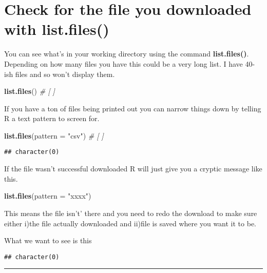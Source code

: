 \documentclass[]{book}
\newenvironment{Shaded}{\begin{snugshade}}{\end{snugshade}}
\newcommand{\KeywordTok}[1]{\textcolor[rgb]{0.13,0.29,0.53}{\textbf{#1}}}
\newcommand{\DataTypeTok}[1]{\textcolor[rgb]{0.13,0.29,0.53}{#1}}
\newcommand{\StringTok}[1]{\textcolor[rgb]{0.31,0.60,0.02}{#1}}
\newcommand{\CommentTok}[1]{\textcolor[rgb]{0.56,0.35,0.01}{\textit{#1}}}
\newcommand{\NormalTok}[1]{#1}
\theoremstyle{definition}
\theoremstyle{definition}
\theoremstyle{definition}
\theoremstyle{remark}
\begin{document}
\section{Check for the file you downloaded with
list.files()}\label{check-for-the-file-you-downloaded-with-list.files}

You can see what's in your working directory using the command
\textbf{list.files()}. Depending on how many files you have this could
be a very long list. I have 40-ish files and so won't display them.

\begin{Shaded}
\begin{Highlighting}[]
\KeywordTok{list.files}\NormalTok{() }\CommentTok{# [ ]}
\end{Highlighting}
\end{Shaded}

If you have a ton of files being printed out you can narrow things down
by telling R a text pattern to screen for.

\begin{Shaded}
\begin{Highlighting}[]
\KeywordTok{list.files}\NormalTok{(}\DataTypeTok{pattern =} \StringTok{"csv"}\NormalTok{) }\CommentTok{# [ ]}
\end{Highlighting}
\end{Shaded}

\begin{verbatim}
## character(0)
\end{verbatim}

If the file wasn't successful downloaded R will just give you a cryptic
message like this.

\begin{Shaded}
\begin{Highlighting}[]
\KeywordTok{list.files}\NormalTok{(}\DataTypeTok{pattern =} \StringTok{"xxxx"}\NormalTok{)}
\end{Highlighting}
\end{Shaded}

This means the file isn't' there and you need to redo the download to
make sure either i)the file actually downloaded and ii)file is saved
where you want it to be.

What we want to see is this

\begin{verbatim}
## character(0)
\end{verbatim}

\begin{center}\rule{0.5\linewidth}{\linethickness}\end{center}
\end{document}
